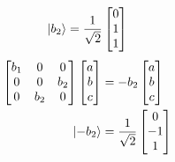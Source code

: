 \documentclass[12pt]{article}
\begin{document}
\begin{align*}
    \Ket{b_2} &= \frac{1}{\sqrt{2}}\begin{bmatrix}0\\1\\1\end{bmatrix} \\
\end{align*}\begin{align*}
    \begin{bmatrix}
        b_1 & 0 & 0 \\
        0 & 0 & b_2 \\
        0 & b_2 & 0
    \end{bmatrix}
    \begin{bmatrix}a\\b\\c\end{bmatrix} 
        &= -b_2\begin{bmatrix}a\\b\\c\end{bmatrix} \\
    \Ket{-b_2} &= \frac{1}{\sqrt{2}}\begin{bmatrix}0\\-1\\1\end{bmatrix}
\end{align*}
\end{document}
